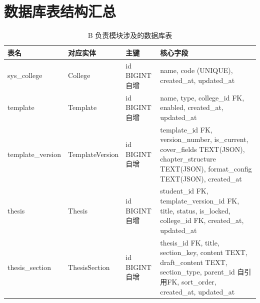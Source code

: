 \section{数据库表结构汇总}

\begin{table}[htbp]
\centering
\caption{B 负责模块涉及的数据库表}
\begin{tabular}{lllp{7cm}}
\toprule
\textbf{表名} & \textbf{对应实体} & \textbf{主键} & \textbf{核心字段} \\
\midrule
sys\_college & College & id BIGINT 自增 & name, code (UNIQUE), created\_at, updated\_at \\
template & Template & id BIGINT 自增 & name, type, college\_id FK, enabled, created\_at, updated\_at \\
template\_version & TemplateVersion & id BIGINT 自增 & template\_id FK, version\_number, is\_current, cover\_fields TEXT(JSON), chapter\_structure TEXT(JSON), format\_config TEXT(JSON), created\_at \\
thesis & Thesis & id BIGINT 自增 & student\_id FK, template\_version\_id FK, title, status, is\_locked, college\_id FK, created\_at, updated\_at \\
thesis\_section & ThesisSection & id BIGINT 自增 & thesis\_id FK, title, section\_key, content TEXT, draft\_content TEXT, section\_type, parent\_id 自引用FK, sort\_order, created\_at, updated\_at \\
\bottomrule
\end{tabular}
\end{table}
